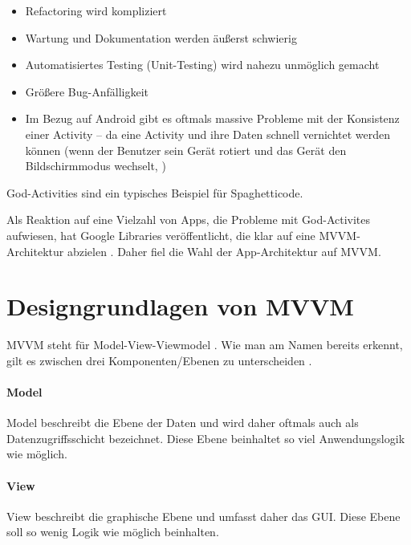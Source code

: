 \begin{itemize}
\tightlist
\item
  Refactoring wird kompliziert
\item
  Wartung und Dokumentation werden äußerst schwierig
\item
  Automatisiertes Testing (\zB Unit-Testing) wird nahezu unmöglich
  gemacht
\item
  Größere Bug-Anfälligkeit
\item
  Im Bezug auf Android gibt es oftmals massive Probleme mit der
  Konsistenz einer Activity -- da eine Activity und ihre Daten schnell
  vernichtet werden können (\zB wenn der Benutzer sein Gerät rotiert und
  das Gerät den Bildschirmmodus wechselt,
  )
\end{itemize}

God-Activities sind ein typisches Beispiel für Spaghetticode.

Als Reaktion auf eine Vielzahl von Apps, die Probleme mit God-Activites
aufwiesen, hat Google Libraries veröffentlicht, die klar auf eine
MVVM-Architektur abzielen \cite{mvvm}. Daher fiel die Wahl der
App-Architektur auf MVVM.

\hypertarget{designgrundlagen-von-mvvm}{%
\section{Designgrundlagen von MVVM}\label{designgrundlagen-von-mvvm}}

MVVM steht für Model-View-Viewmodel \cite{mvvm-wiki}. Wie man am Namen
bereits erkennt, gilt es zwischen drei Komponenten/Ebenen zu
unterscheiden \cite{mvvm-article}.

\hypertarget{model}{%
\paragraph{Model}\label{model}}

Model beschreibt die Ebene der Daten und wird daher oftmals auch als
Datenzugriffsschicht bezeichnet. Diese Ebene beinhaltet so viel
Anwendungslogik wie möglich.

\hypertarget{view}{%
\paragraph{View}\label{view}}

View beschreibt die graphische Ebene und umfasst daher das GUI. Diese
Ebene soll so wenig Logik wie möglich beinhalten.

